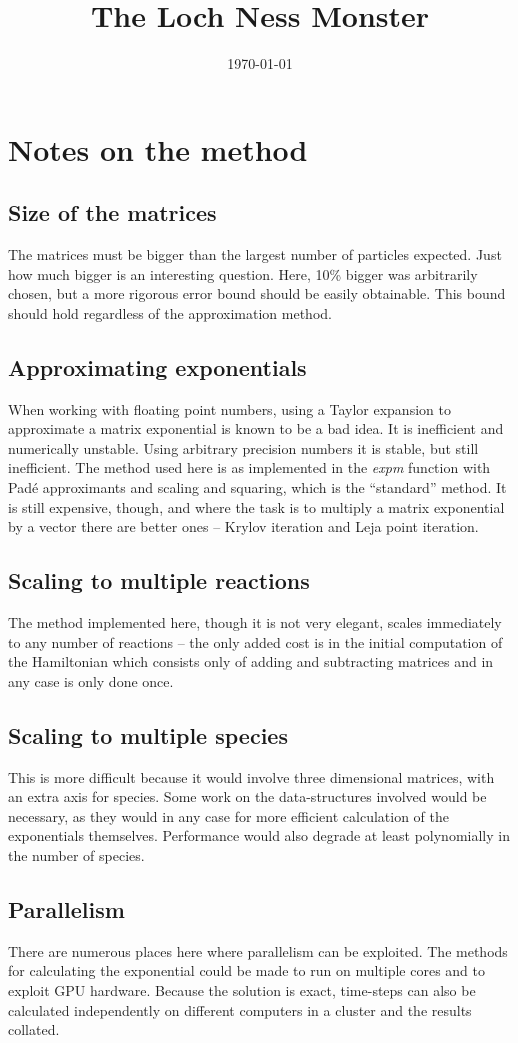 \documentclass{amsart}
\title{The Loch Ness Monster}
\date{\today}
\begin{document}
\maketitle


\section*{Notes on the method}
\subsection*{Size of the matrices}
The matrices must be bigger than the largest number of particles
expected. Just how much bigger is an interesting question. Here, 10\%
bigger was arbitrarily chosen, but a more rigorous error bound should
be easily obtainable. This bound should hold regardless of the
approximation method.

\subsection*{Approximating exponentials}
When working with floating point numbers, using a Taylor expansion to
approximate a matrix exponential is known to be a bad idea. It is
inefficient and numerically unstable. Using arbitrary precision
numbers it is stable, but still inefficient. The method used here is
as implemented in the \emph{expm} function with Pad\'{e} approximants
and scaling and squaring, which is the ``standard'' method. It is
still expensive, though, and where the task is to multiply a matrix
exponential by a vector there are better ones -- Krylov iteration and
Leja point iteration.

\subsection*{Scaling to multiple reactions}
The method implemented here, though it is not very elegant, scales
immediately to any number of reactions -- the only added cost is in
the initial computation of the Hamiltonian which consists only of
adding and subtracting matrices and in any case is only done once.

\subsection*{Scaling to multiple species}
This is more difficult because it would involve three dimensional
matrices, with an extra axis for species. Some work on the
data-structures involved would be necessary, as they would in any case
for more efficient calculation of the exponentials
themselves. Performance would also degrade at least polynomially in
the number of species.

\subsection*{Parallelism}
There are numerous places here where parallelism can be exploited. The
methods for calculating the exponential could be made to run on
multiple cores and to exploit GPU hardware. Because the solution is
exact, time-steps can also be calculated independently on different
computers in a cluster and the results collated.
\end{document}
